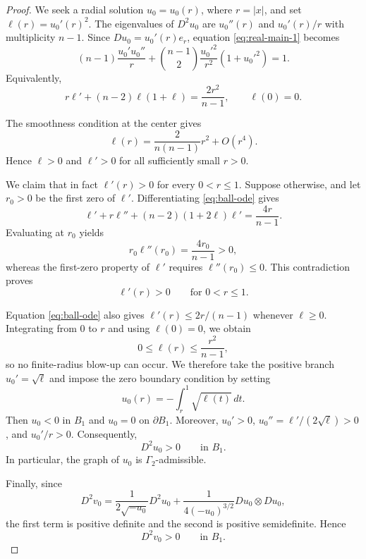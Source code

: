 \documentclass[10pt,a4paper]{amsart}
\begin{document}
\begin{proof}
We seek a radial solution $u_0=u_0(r)$, where $r=|x|$, and set
$\ell(r)=u_0'(r)^2$. The eigenvalues of $D^2u_0$ are $u_0''(r)$ and
$u_0'(r)/r$ with multiplicity $n-1$. Since
$Du_0=u_0'(r)e_r$, equation \eqref{eq:real-main-1} becomes
\[
(n-1)\frac{u_0'u_0''}{r}
+
\binom{n-1}{2}
\frac{u_0'^2}{r^2}(1+u_0'^2)
=
1.
\]
Equivalently,
\begin{equation}\label{eq:ball-ode}
r\ell'+(n-2)\ell(1+\ell)
=
\frac{2r^2}{n-1},
\qquad
\ell(0)=0.
\end{equation}

The smoothness condition at the center gives
\begin{equation}\label{eq:ball-center}
\ell(r)
=
\frac{2}{n(n-1)}r^2+O(r^4).
\end{equation}
Hence $\ell>0$ and $\ell'>0$ for all sufficiently small $r>0$.

We claim that in fact $\ell'(r)>0$ for every $0<r\le1$. Suppose
otherwise, and let $r_0>0$ be the first zero of $\ell'$. Differentiating
\eqref{eq:ball-ode} gives
\[
\ell'+r\ell''+(n-2)(1+2\ell)\ell'
=
\frac{4r}{n-1}.
\]
Evaluating at $r_0$ yields
\[
r_0\ell''(r_0)
=
\frac{4r_0}{n-1}>0,
\]
whereas the first-zero property of $\ell'$ requires
$\ell''(r_0)\le0$. This contradiction proves
\begin{equation}\label{eq:ell-positive}
\ell'(r)>0
\qquad\text{for }0<r\le1.
\end{equation}

Equation \eqref{eq:ball-ode} also gives
$\ell'(r)\le2r/(n-1)$ whenever $\ell\ge0$. Integrating from $0$ to $r$ and using
$\ell(0)=0$, we obtain
\[
0\le \ell(r)\le \frac{r^2}{n-1},
\]
so no finite-radius blow-up can occur. We therefore take the positive branch
$u_0'=\sqrt{\ell}$ and impose the zero boundary condition by setting
\begin{equation}\label{eq:ball-solution}
u_0(r)
=
-\int_r^1\sqrt{\ell(t)}\,dt.
\end{equation}
Then $u_0<0$ in $B_1$ and $u_0=0$ on $\partial B_1$. Moreover,
$u_0'>0$, $u_0''=\ell'/(2\sqrt{\ell})>0$, and $u_0'/r>0$.
Consequently,
\[
D^2u_0>0
\qquad\text{in }B_1.
\]
In particular, the graph of $u_0$ is $\Gamma_2$-admissible.

Finally, since
\[
D^2v_0
=
\frac{1}{2\sqrt{-u_0}}D^2u_0
+
\frac{1}{4(-u_0)^{3/2}}
Du_0\otimes Du_0,
\]
the first term is positive definite and the second is positive
semidefinite. Hence
\[
D^2v_0>0
\qquad\text{in }B_1.
\]
\end{proof}
\end{document}
